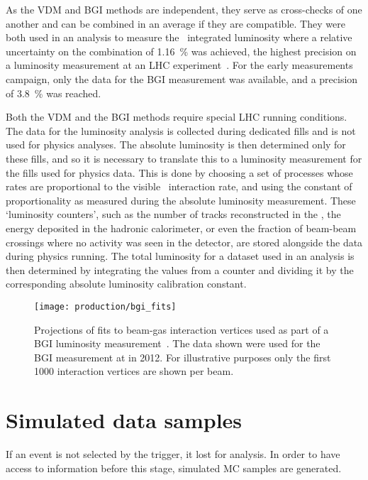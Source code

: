 As the \ac{VDM} and \ac{BGI} methods are independent, they serve as 
cross-checks of one another and can be combined in an average if they are 
compatible.
They were both used in an analysis to measure the \runone\ integrated 
luminosity where a relative uncertainty on the combination of 
\SI{1.16}{\percent} was achieved, the highest precision on a luminosity 
measurement at an \ac{LHC} experiment~\cite{LHCb-PAPER-2014-047}.
For the early measurements campaign, only the data for the \ac{BGI} measurement 
was available, and a precision of \SI{3.8}{\percent} was reached.

Both the \ac{VDM} and the \ac{BGI} methods require special \ac{LHC} running 
conditions.
The data for the luminosity analysis is collected during dedicated fills and is 
not used for physics analyses.
The absolute luminosity is then determined only for these fills, and so it is 
necessary to translate this to a luminosity measurement for the fills used for 
physics data.
This is done by choosing a set of processes whose rates are proportional to the 
visible \pp\ interaction rate, and using the constant of proportionality as 
measured during the absolute luminosity measurement.
These `luminosity counters', such as the number of tracks reconstructed in the 
\velo, the energy deposited in the hadronic calorimeter, or even the fraction 
of beam-beam crossings where no activity was seen in the detector, are stored 
alongside the data during physics running.
The total luminosity for a dataset used in an analysis is then determined by 
integrating the values from a counter and dividing it by the corresponding 
absolute luminosity calibration constant.

\begin{figure}
  \centering
  \texttt{[image: production/bgi\_fits]}
  \caption{%
    Projections of fits to beam-gas interaction vertices used as part of a 
    \acl{BGI} luminosity measurement~\cite{LHCb-PAPER-2014-047}.
    The data shown were used for the \ac{BGI} measurement at  in 
    2012.
    For illustrative purposes only the first \num{1000} interaction vertices 
    are shown per beam.
  }
  \label{fig:prod:data:lumi:bgi_fits}
\end{figure}

\section{Simulated data samples}
\label{chap:prod:data:mc}

If an event is not selected by the trigger, it lost for analysis.
In order to have access to information before this stage, simulated \acf{MC} 
samples are generated.

